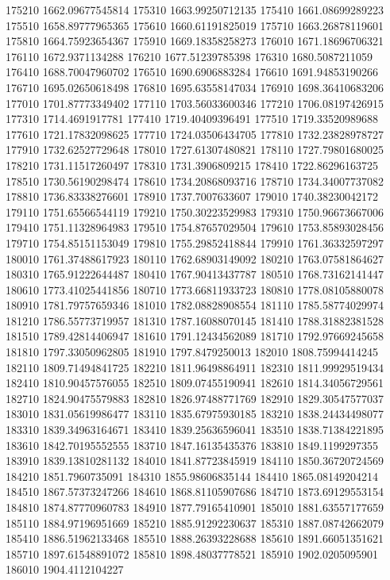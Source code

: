 {175210 1662.09677545814
175310 1663.99250712135
175410 1661.08699289223
175510 1658.89777965365
175610 1660.61191825019
175710 1663.26878119601
175810 1664.75923654367
175910 1669.18358258273
176010 1671.18696706321
176110 1672.9371134288
176210 1677.51239785398
176310 1680.5087211059
176410 1688.70047960702
176510 1690.6906883284
176610 1691.94853190266
176710 1695.02650618498
176810 1695.63558147034
176910 1698.36410683206
177010 1701.87773349402
177110 1703.56033600346
177210 1706.08197426915
177310 1714.4691917781
177410 1719.40409396491
177510 1719.33520989688
177610 1721.17832098625
177710 1724.03506434705
177810 1732.23828978727
177910 1732.62527729648
178010 1727.61307480821
178110 1727.79801680025
178210 1731.11517260497
178310 1731.3906809215
178410 1722.86296163725
178510 1730.56190298474
178610 1734.20868093716
178710 1734.34007737082
178810 1736.83338276601
178910 1737.7007633607
179010 1740.38230042172
179110 1751.65566544119
179210 1750.30223529983
179310 1750.96673667006
179410 1751.11328964983
179510 1754.87657029504
179610 1753.85893028456
179710 1754.85151153049
179810 1755.29852418844
179910 1761.36332597297
180010 1761.37488617923
180110 1762.68903149092
180210 1763.07581864627
180310 1765.91222644487
180410 1767.90413437787
180510 1768.73162141447
180610 1773.41025441856
180710 1773.66811933723
180810 1778.08105880078
180910 1781.79757659346
181010 1782.08828908554
181110 1785.58774029974
181210 1786.55773719957
181310 1787.16088070145
181410 1788.31882381528
181510 1789.42814406947
181610 1791.12434562089
181710 1792.97669245658
181810 1797.33050962805
181910 1797.8479250013
182010 1808.75994414245
182110 1809.71494841725
182210 1811.96498864911
182310 1811.99929519434
182410 1810.90457576055
182510 1809.07455190941
182610 1814.34056729561
182710 1824.90475579883
182810 1826.97488771769
182910 1829.30547577037
183010 1831.05619986477
183110 1835.67975930185
183210 1838.24434498077
183310 1839.34963164671
183410 1839.25636596041
183510 1838.71384221895
183610 1842.70195552555
183710 1847.16135435376
183810 1849.1199297355
183910 1839.13810281132
184010 1841.87723845919
184110 1850.36720724569
184210 1851.7960735091
184310 1855.98606835144
184410 1865.08149204214
184510 1867.57373247266
184610 1868.81105907686
184710 1873.69129553154
184810 1874.87770960783
184910 1877.79165410901
185010 1881.63557177659
185110 1884.97196951669
185210 1885.91292230637
185310 1887.08742662079
185410 1886.51962133468
185510 1888.26393228688
185610 1891.66051351621
185710 1897.61548891072
185810 1898.48037778521
185910 1902.0205095901
186010 1904.4112104227
}
